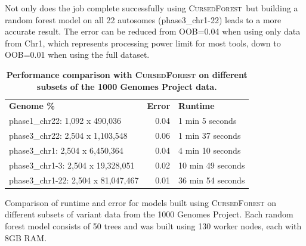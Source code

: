 \documentclass[10pt,letterpaper]{article}
\newlength\savedwidth
\newcommand\thickhline{\noalign{\global\savedwidth\arrayrulewidth\global\arrayrulewidth 2pt}%
\hline
\noalign{\global\arrayrulewidth\savedwidth}}
\newcommand{\cursedforest}{\textsc{CursedForest}\xspace}
\begin{document}
Not only does the job complete successfully using \cursedforest\, but building a random
forest model on all 22 autosomes (phase3\_chr1-22)  leads to a more accurate result. 
The error can be reduced from OOB=0.04 when using only data from Chr1, which represents processing power limit for most tools, down to OOB=0.01 when using the full dataset. 



\begin{table}[!ht]
\begin{minipage}{\textwidth}
\centering
\caption{ {\bf Performance comparison with \cursedforest on different subsets of the 1000 Genomes Project data.}}
\begin{tabular}{| l | r | l |}
\hline
{\bf Genome \%} & {\bf Error} & {\bf Runtime} \\ \thickhline
phase1\_chr22: 1,092 x 490,036 & 0.04 & 1 min 5 seconds \\ \hline
phase3\_chr22: 2,504 x 1,103,548 & 0.06 & 1 min 37 seconds \\ \hline
phase3\_chr1: 2,504 x 6,450,364 & 0.04 & 4 min 10 seconds \\ \hline
phase3\_chr1-3: 2,504 x 19,328,051 & 0.02 & 10 min 49 seconds \\ \hline
phase3\_chr1-22: 2,504 x 81,047,467 & 0.01 & 36 min 54 seconds \\ \hline
\end{tabular}
\begin{flushleft} 
Comparison of runtime and error for models built using \cursedforest on different subsets of variant data 
from the 1000 Genomes Project.
Each random forest model consists of 50 trees and was built using 130 worker nodes, each with 8GB RAM.
\end{flushleft}
\label{cursedforesttable}
\end{minipage}
\end{table}
\end{document}
